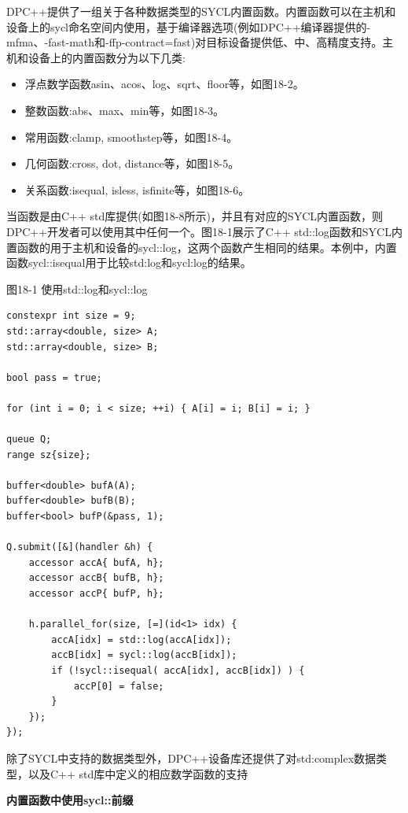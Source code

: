 DPC++提供了一组关于各种数据类型的SYCL内置函数。内置函数可以在主机和设备上的sycl命名空间内使用，基于编译器选项(例如DPC++编译器提供的-mfma、-fast-math和-ffp-contract=fast)对目标设备提供低、中、高精度支持。主机和设备上的内置函数分为以下几类:\par

\begin{itemize}
	\item 浮点数学函数asin、acos、log、sqrt、floor等，如图18-2。
	\item 整数函数:abs、max、min等，如图18-3。
	\item 常用函数:clamp, smoothstep等，如图18-4。
	\item 几何函数:cross, dot, distance等，如图18-5。
	\item 关系函数:isequal, isless, isfinite等，如图18-6。
\end{itemize}

当函数是由C++ std库提供(如图18-8所示)，并且有对应的SYCL内置函数，则DPC++开发者可以使用其中任何一个。图18-1展示了C++ std::log函数和SYCL内置函数的用于主机和设备的sycl::log，这两个函数产生相同的结果。本例中，内置函数sycl::isequal用于比较std:log和sycl:log的结果。\par

\hspace*{\fill} \par %
图18-1 使用std::log和sycl::log
\begin{lstlisting}[caption={}]
constexpr int size = 9;
std::array<double, size> A;
std::array<double, size> B;

bool pass = true;

for (int i = 0; i < size; ++i) { A[i] = i; B[i] = i; }

queue Q;
range sz{size};

buffer<double> bufA(A);
buffer<double> bufB(B);
buffer<bool> bufP(&pass, 1);

Q.submit([&](handler &h) {
	accessor accA{ bufA, h};
	accessor accB{ bufB, h};
	accessor accP{ bufP, h};
	
	h.parallel_for(size, [=](id<1> idx) {
		accA[idx] = std::log(accA[idx]);
		accB[idx] = sycl::log(accB[idx]);
		if (!sycl::isequal( accA[idx], accB[idx]) ) {
			accP[0] = false;
		}
	});
});
\end{lstlisting}

除了SYCL中支持的数据类型外，DPC++设备库还提供了对std:complex数据类型，以及C++ std库中定义的相应数学函数的支持\par

\hspace*{\fill} \par %
\textbf{内置函数中使用sycl::前缀}

